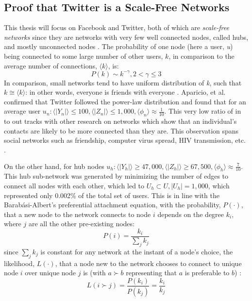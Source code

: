 \documentclass[preprint,review,12pt]{elsarticle}
\begin{document}
\subsection{Proof that Twitter is a Scale-Free Networks}
\label{scalefreenetwork}
This thesis will focus on Facebook and Twitter, both of which are \textit{scale-free networks} \cite{aparicio2015model,broido2019scale,barabasi2000scale} since they are networks with very few well connected nodes, called hubs, and mostly unconnected nodes \cite{barabasi2009scale,barabasi1999emergence,dorogovtsev2002evolution}. The probability of one node (here a user, \textit{u}) being connected to some large number of other users, $k$, in comparison to the average number of connections, $\langle k \rangle$, is: 
\begin{equation}
\label{powerlaw}
    P(k) \sim k^{-\gamma}, 2 < \gamma \leq 3
\end{equation}
In comparison, small networks tend to have uniform distribution of \textit{k}, such that $k \cong \langle k \rangle$: in other words, everyone is friends with everyone \cite{erdHos1960evolution,watts1998collective}. Aparicio, et al. confirmed that Twitter followed the power-law distribution and found that for an average user $u_n:\langle | Y_n| \rangle \leq 100, \langle | Z_n| \rangle \leq 1,000, \langle  \phi_n \rangle \approx \frac{1}{10}$. This very low ratio of in to out tracks with other research on networks which show that an individual's contacts are likely to be more connected than they are. This observation spans social networks such as friendship, computer virus spread, HIV transmission, etc. \cite{feld1991your,newman2003ego,pastor2001epidemic,pastor2002epidemic,pastor2015epidemic,helleringer2007sexual}.

On the other hand, for hub nodes $u_h: \langle | Y_h| \rangle \geq 47,000, \langle | Z_h| \rangle \geq 67,500, \langle  \phi_h \rangle \approx \frac{7}{10}$. This hub sub-network was generated by minimizing the number of edges to connect all nodes with each other, which led to $U_h \subset U, |U_h| = 1,000$, which represented only 0.002\% of the total set of users. This is in line with the Barab{\'a}si-Albert's preferential attachment equation, with the probability, $P(\cdot)$, that a new node to the network connects to node $i$ depends on the degree $k_i$, where $j$ are all the other pre-existing nodes:
\begin{equation}
\label{preferentialequation}
    P(i)=\frac{k_i}{\sum_{j} k_j}
\end{equation}
since $\sum_{j} k_j$ is constant for any network at the instant of a node's choice, the likelihood, $L(\cdot)$, that a node new to the network chooses to connect to unique node $i$ over unique node $j$ is (with $a \succ b$ representing that $a$ is preferable to $b$) :
\begin{equation}
\label{reducedpreferentialequation}
    L(i \succ j)=\frac{P(k_i)}{P(k_j)} = \frac{k_i}{k_j}
\end{equation}
\end{document}
